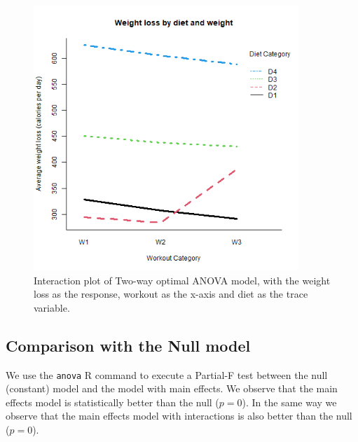 \documentclass[12pt, a4paper]{article}
\def\code#1{\texttt{#1}}
\begin{document}
	\begin{figure}
		\includegraphics[width=10cm]{interaction_2.png}
		\centering
		\caption{Interaction plot of Two-way optimal ANOVA model, with the weight loss as the response, workout as the x-axis and diet as the trace variable.}
		\label{fig::interaction_2}
	\end{figure}
	
	
	\subsection{Comparison with the Null model}
	
	We use the \code{anova} R command to execute a Partial-F test between the null (constant) model and the model with main effects. We observe that the main effects model is statistically better than the null ($p=0$). In the same way we observe that the main effects model with interactions is also better than the null ($p=0$).
	
	\printbibliography
\end{document}
